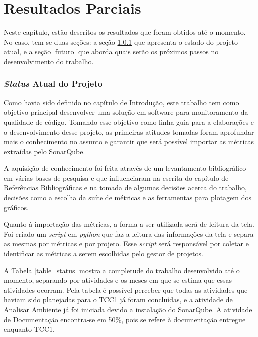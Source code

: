 \chapter[Resultados parciais]{Resultados Parciais}
\label{sec:resultados_parciais}
Neste capítulo, estão descritos os resultados que foram obtidos até o momento. No caso, tem-se duas seções: a seção \ref{status} que apresenta o estado do projeto atual, e a seção \ref{futuro} que aborda quais serão os próximos passos no desenvolvimento do trabalho.

\subsection{\textit{Status} Atual do Projeto}
\label{status}

Como havia sido definido no capítulo de Introdução, este trabalho tem como objetivo principal desenvolver uma solução em software para monitoramento da qualidade de código. Tomando esse objetivo como linha guia para a elaborações e o desenvolvimento desse projeto, as primeiras atitudes tomadas foram aprofundar mais o conhecimento no assunto e garantir que será possível importar as métricas extraídas pelo SonarQube.

A aquisição de conhecimento foi feita através de um levantamento bibliográfico em várias bases de pesquisa e que influenciaram na escrita do capítulo de Referências Bibliográficas e na tomada de algumas decisões acerca do trabalho, decisões como a escolha da suíte de métricas e as ferramentas para plotagem dos gráficos.

Quanto à importação das métricas, a forma a ser utilizada será de leitura da tela. Foi criado um \textit{script} em \textit{python} que faz a leitura das informações da tela e separa as mesmas por métricas e por projeto. Esse \textit{script} será responsável por coletar e identificar as métricas a serem escolhidas pelo gestor de projetos. 

A Tabela \ref{table_status} mostra a completude do trabalho desenvolvido até o momento, separando por atividades e os meses em que se estima que essas atividades ocorram. Pela tabela é possível perceber que todas as atividades que haviam sido planejadas para o TCC1 já foram concluídas, e a atividade de Analisar Ambiente já foi iniciada devido a instalação do SonarQube. A atividade de Documentação encontra-se em 50\%, pois se refere à documentação entregue enquanto TCC1.

